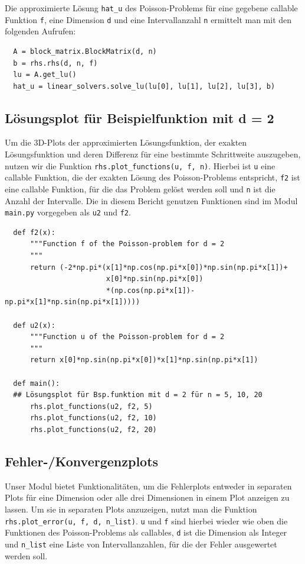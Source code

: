 \documentclass{scrartcl}
\begin{document}
Die approximierte Lösung \texttt{hat\_u} des Poisson-Problems für eine gegebene callable Funktion \texttt{f}, eine Dimension \texttt{d} und eine Intervallanzahl \texttt{n} ermittelt man mit den folgenden Aufrufen:

\begin{verbatim}
  A = block_matrix.BlockMatrix(d, n)
  b = rhs.rhs(d, n, f)
  lu = A.get_lu()
  hat_u = linear_solvers.solve_lu(lu[0], lu[1], lu[2], lu[3], b)
\end{verbatim}

\subsection{Lösungsplot für Beispielfunktion mit d = 2}

Um die 3D-Plots der approximierten Lösungsfunktion, der exakten Lösungsfunktion und deren Differenz für eine bestimmte Schrittweite auszugeben, nutzen wir die Funktion \texttt{rhs.plot\_functions(u, f, n)}.
Hierbei ist \texttt{u} eine callable Funktion, die der exakten Lösung des Poisson-Problems entspricht, \texttt{f2} ist eine callable Funktion, für die das Problem gelöst werden soll und \texttt{n} ist die Anzahl der Intervalle.
Die in diesem Bericht genutzen Funktionen sind im Modul \texttt{main.py} vorgegeben als \texttt{u2} und \texttt{f2}.

\begin{verbatim}
  def f2(x):
      """Function f of the Poisson-problem for d = 2
      """
      return (-2*np.pi*(x[1]*np.cos(np.pi*x[0])*np.sin(np.pi*x[1])+
                        x[0]*np.sin(np.pi*x[0])
                        *(np.cos(np.pi*x[1])- np.pi*x[1]*np.sin(np.pi*x[1]))))

  def u2(x):
      """Function u of the Poisson-problem for d = 2
      """
      return x[0]*np.sin(np.pi*x[0])*x[1]*np.sin(np.pi*x[1])

  def main():
  ## Lösungsplot für Bsp.funktion mit d = 2 für n = 5, 10, 20
      rhs.plot_functions(u2, f2, 5)
      rhs.plot_functions(u2, f2, 10)
      rhs.plot_functions(u2, f2, 20)
\end{verbatim}

\subsection{Fehler-/Konvergenzplots}

Unser Modul bietet Funktionalitäten, um die Fehlerplots entweder in separaten Plots für eine Dimension oder alle drei Dimensionen in einem Plot anzeigen zu lassen.
Um sie in separaten Plots anzuzeigen, nutzt man die Funktion \texttt{rhs.plot\_error(u, f, d, n\_list)}.
\texttt{u} und \texttt{f} sind hierbei wieder wie oben die Funktionen des Poisson-Problems als callables, \texttt{d} ist die Dimension als Integer und \texttt{n\_list} eine Liste von Intervallanzahlen, für die der Fehler ausgewertet werden soll.
\end{document}

